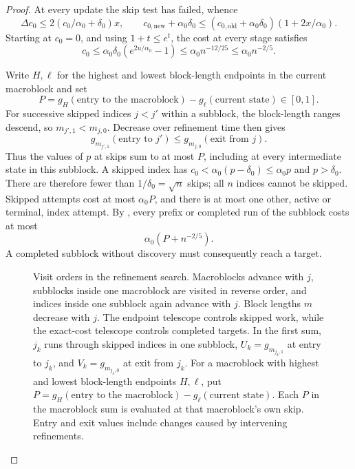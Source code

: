 \begin{proof}
At every update the skip test has failed, whence
\[
 \Delta c_0\le2(c_0/\alpha_0+\delta_0)x,\qquad
 c_{0,\mathrm{new}}+\alpha_0\delta_0
 \le(c_{0,\mathrm{old}}+\alpha_0\delta_0)(1+2x/\alpha_0).
\]
Starting at $c_0=0$, and using $1+t\le e^t$, the cost at every stage satisfies
\begin{equation}
 c_0\le\alpha_0\delta_0(e^{2u/\alpha_0}-1)
 \le\alpha_0 n^{-12/25}\le\alpha_0 n^{-2/5}.
 \label{entropy-refinement:index-cost}
\end{equation}

Write $H,\ell$ for the highest and lowest block-length endpoints in the current
macroblock and set
\[
 P=g_H(\text{entry to the macroblock})-g_\ell(\text{current state})\in[0,1].
\]
For successive skipped indices $j<j'$ within a subblock, the block-length ranges
descend, so $m_{j',1}<m_{j,0}$. Decrease over refinement time then gives
\begin{equation}
 g_{m_{j',1}}(\text{entry to }j')
 \le g_{m_{j,0}}(\text{exit from }j).
 \label{entropy-refinement:mirror-telescope}
\end{equation}
Thus the values of $p$ at skips sum to at most $P$, including at every
intermediate state in this subblock. A skipped index has
$c_0<\alpha_0(p-\delta_0)\le\alpha_0p$ and $p>\delta_0$.
There are therefore fewer than $1/\delta_0=\sqrt n$ skips; all $n$ indices
cannot be skipped. Skipped attempts cost at most $\alpha_0P$, and there is
at most one other, active or terminal, index attempt.
By , every prefix or completed run of the
subblock costs at most
\begin{equation}
 \alpha_0(P+n^{-2/5}).
 \label{entropy-refinement:subblock-cost}
\end{equation}
A completed subblock without discovery must consequently reach a target.

\begin{figure}[tbp]
 \centering
 
 \caption{Visit orders in the refinement search. Macroblocks advance with
 $j$, subblocks inside one macroblock are visited in reverse order, and indices
 inside one subblock again advance with $j$. Block lengths $m$ decrease
 with $j$. The endpoint telescope controls skipped work, while the exact-cost
 telescope controls completed targets. In the first sum, $j_k$ runs through
 skipped indices in one subblock, $U_k=g_{m_{j_k,1}}$ at entry to $j_k$, and
 $V_k=g_{m_{j_k,0}}$ at exit from $j_k$. For a macroblock with highest and
 lowest block-length endpoints $H,\ell$, put
 $P=g_H(\text{entry to the macroblock})-g_\ell(\text{current state})$.
 Each $P$ in the macroblock sum is evaluated at that macroblock's own skip. Entry and exit values include
 changes caused by intervening refinements.}
 \label{entropy-refinement:skip-figure}
\end{figure}


\end{proof}
